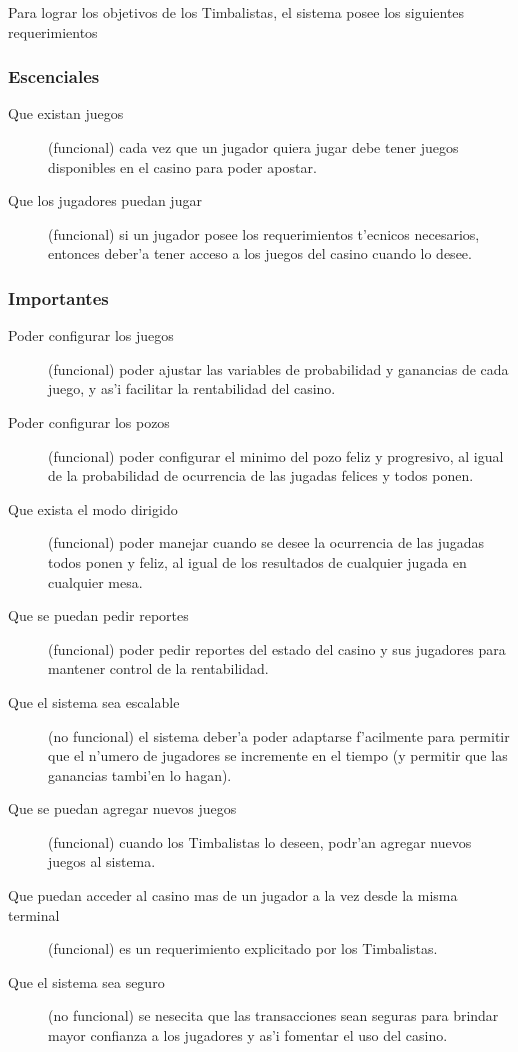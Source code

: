 Para lograr los objetivos de los Timbalistas, el sistema posee los siguientes requerimientos

\subsubsection{Escenciales}
\begin{description}
\item[Que existan juegos] (funcional) cada vez que un jugador quiera jugar debe tener juegos disponibles en el casino para poder apostar.
\item[Que los jugadores puedan jugar] (funcional) si un jugador posee los requerimientos t'ecnicos necesarios, entonces deber'a tener acceso a los juegos del casino cuando lo desee.
\end{description}


\subsubsection{Importantes}
\begin{description}
\item[Poder configurar los juegos] (funcional) poder ajustar las variables de probabilidad y ganancias de cada juego, y as'i facilitar la rentabilidad del casino.
\item[Poder configurar los pozos] (funcional) poder configurar el minimo del pozo feliz y progresivo, al igual de la probabilidad de ocurrencia de las jugadas felices y todos ponen.
\item[Que exista el modo dirigido] (funcional) poder manejar cuando se desee la ocurrencia de las jugadas todos ponen y feliz, al igual de los resultados de cualquier jugada en cualquier mesa.
\item[Que se puedan pedir reportes] (funcional) poder pedir reportes del estado del casino y sus jugadores para mantener control de la rentabilidad.
\item[Que el sistema sea escalable] (no funcional) el sistema deber'a poder adaptarse f'acilmente para permitir que el n'umero de jugadores se incremente en el tiempo (y permitir que las ganancias tambi'en lo hagan).
\item[Que se puedan agregar nuevos juegos] (funcional) cuando los Timbalistas lo deseen, podr'an agregar nuevos juegos al sistema.
\item[Que puedan acceder al casino mas de un jugador a la vez desde la misma terminal] (funcional) es un requerimiento explicitado por los Timbalistas.
\item[Que el sistema sea seguro] (no funcional) se nesecita que las transacciones sean seguras para brindar mayor confianza a los jugadores y as'i fomentar el uso del casino.
\end{description}


